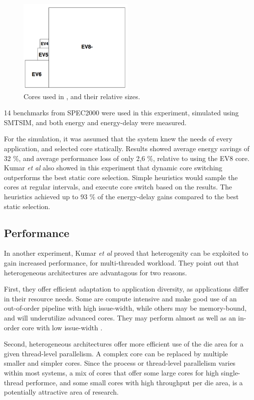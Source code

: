 \begin{figure}[htb]
    \centering
    \includegraphics[width=0.5\textwidth]{Figures/Heterogeneous/Kumar1}
    \caption{Cores used in \cite{heterogeneous-ee}, and their relative sizes.}
    \label{fig:Kumar1}
\end{figure}

14 benchmarks from SPEC2000 were used in this experiment, simulated using SMTSIM, and both energy and energy-delay were measured.

For the simulation, it was assumed that the system knew the needs of every application, and selected core statically. 
Results showed average energy savings of 32 \%, and average performance loss of only 2,6 \%, relative to using the EV8 core.
Kumar \textit{et al} also showed in this experiment that dynamic core switching outperforms the best static core selection.
Simple heuristics would sample the cores at regular intervals, and execute core switch based on the results.
The heuristics achieved up to 93 \% of the energy-delay gains compared to the best static selection. 

\subsection{Performance}
\label{subsec:rw_perf}
In another experiment, Kumar \textit{et al} proved that heterogenity can be exploited to gain increased performance, for multi-threaded workload.
They point out that heterogeneous architectures are advantagous for two reasons.

First, they offer efficient adaptation to application diversity, as applications differ in their resource needs.
Some are compute intensive and make good use of an out-of-order pipeline with high issue-width, while others may be memory-bound, and will underutilize advanced cores.
They may perform almost as well as an in-order core with low issue-width \cite{heterogeneous-perf}.

Second, heterogeneous architectures offer more efficient use of the die area for a given thread-level parallelism.
A complex core can be replaced by multiple smaller and simpler cores. 
Since the process or thread-level parallelism varies within most systems, a mix of cores that offer some large cores for high single-thread performce, and some small cores with high throughput per die area, is a potentially attractive area of research. \cite{heterogeneous-perf}


